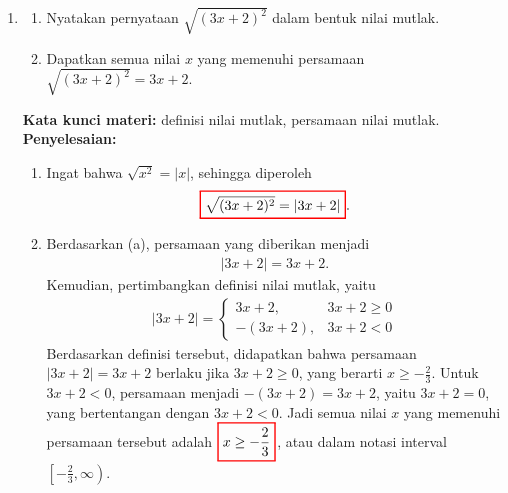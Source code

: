 \documentclass[10pt,openany,a4paper]{article}
\theoremstyle{definition}
\theoremstyle{definition}
\theoremstyle{plain}
\newenvironment{jawab}[2][tes]{%
\par\noindent\textbf{Kata kunci materi:} #1.\\
\textbf{Penyelesaian:} #2%
}{}
\begin{document}
\begin{enumerate}
    \item \begin{enumerate}
        \item Nyatakan pernyataan $\sqrt{(3x+2)^2}$ dalam bentuk nilai mutlak.
        \item Dapatkan semua nilai $x$ yang memenuhi persamaan $\sqrt{(3x+2)^2}=3x+2$.
    \end{enumerate}
    \begin{jawab}[definisi nilai mutlak, persamaan nilai mutlak]{
        \begin{enumerate}
            \item Ingat bahwa $\sqrt{x^2}=|x|$, sehingga diperoleh
            \begin{align*}
                \colorlet{oldcolor}{.}
        \color{red}
        \setlength{\fboxrule}{1pt} \boxed{\color{oldcolor}\sqrt{(3x+2)^2} = |3x+2|}\color{oldcolor}.
            \end{align*}
            \item Berdasarkan (a), persamaan yang diberikan menjadi
            \begin{align*}
                |3x+2| = 3x+2.
            \end{align*}
            Kemudian, pertimbangkan definisi nilai mutlak, yaitu
            \begin{align*}
                |3x+2| = \begin{cases}
                    3x+2, & 3x+2 \geq 0\\
                    -(3x+2), & 3x+2 < 0
                \end{cases}
            \end{align*}
            Berdasarkan definisi tersebut, didapatkan bahwa persamaan $|3x+2| = 3x+2$ berlaku jika $3x+2 \geq 0$, yang berarti $x \geq -\frac{2}{3}$. Untuk $3x+2<0$, persamaan menjadi $-(3x+2)=3x+2$, yaitu $3x+2=0$, yang bertentangan dengan $3x+2<0$. Jadi semua nilai $x$ yang memenuhi persamaan tersebut adalah $\colorlet{oldcolor}{.}
        \color{red}
        \setlength{\fboxrule}{1pt} \boxed{\color{oldcolor}x \geq -\frac{2}{3}}\color{oldcolor}$, atau dalam notasi interval $\left[-\frac{2}{3},\infty\right)$.
        \end{enumerate}
    }
    \end{jawab}


\end{enumerate}
\end{document}
